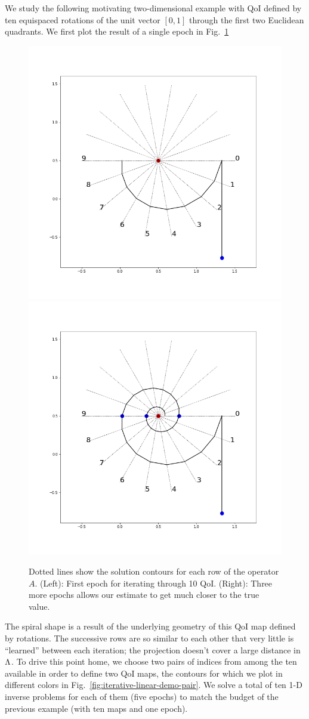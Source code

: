 We study the following motivating two-dimensional example with QoI defined by ten equispaced rotations of the unit vector $[0, 1]$ through the first two Euclidean quadrants.
We first plot the result of a single epoch in Fig.~\ref{fig:iterative-linear-demo}
\begin{figure}
  \centering
  \includegraphics[width=0.475\linewidth]{examples/iterative/10D-firstepoch}
  \includegraphics[width=0.475\linewidth]{examples/iterative/10D-fewepochs}

  \caption{
  Dotted lines show the solution contours for each row of the operator $A$.
  (Left): First epoch for iterating through 10 QoI.
  (Right): Three more epochs allows our estimate to get much closer to the true value.
  }
  \label{fig:iterative-linear-demo}
\end{figure}

The spiral shape is a result of the underlying geometry of this QoI map defined by rotations. The successive rows are so similar to each other that very little is ``learned'' between each iteration; the projection doesn't cover a large distance in ${\Lambda}$.
To drive this point home, we choose two pairs of indices from among the ten available in order to define two QoI maps, the contours for which we plot in different colors in Fig.~\ref{fig:iterative-linear-demo-pair}.
We solve a total of ten 1-D inverse problems for each of them (five epochs) to match the budget of the previous example (with ten maps and one epoch).

